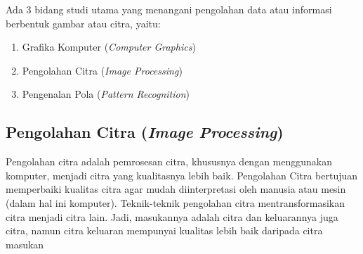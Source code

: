 	Ada 3 bidang studi utama yang menangani pengolahan data atau informasi berbentuk gambar atau citra, yaitu:
	\begin{enumerate}
		\item Grafika Komputer (\emph{Computer Graphics})
		\item Pengolahan Citra (\emph{Image Processing})
		\item Pengenalan Pola (\emph{Pattern Recognition})
	\end{enumerate}
	
	\subsection{Pengolahan Citra (\emph{Image Processing})}
	Pengolahan citra adalah pemrosesan citra, khususnya dengan menggunakan komputer, menjadi citra yang kualitasnya lebih baik. Pengolahan Citra bertujuan memperbaiki kualitas citra agar mudah diinterpretasi oleh manusia atau mesin (dalam hal ini komputer). Teknik-teknik pengolahan citra mentransformasikan citra menjadi citra lain. Jadi, masukannya adalah citra dan keluarannya juga citra, namun citra keluaran mempunyai kualitas lebih baik daripada citra masukan \cite{munir04}
	
